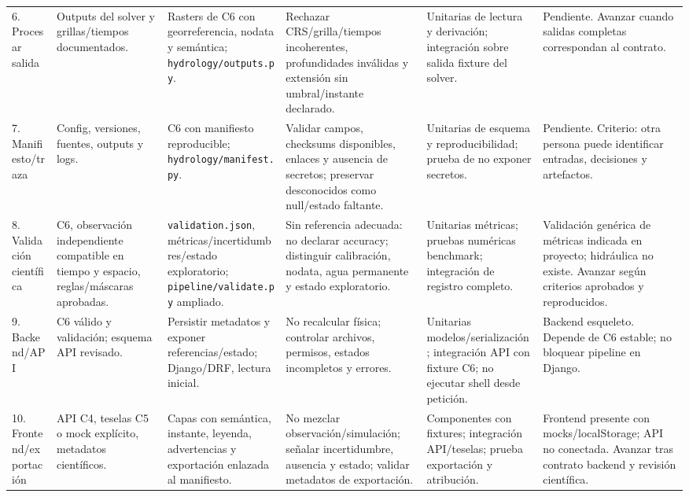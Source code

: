 \documentclass[11pt,a4paper]{article}
\begin{document}
\begin{landscape}
\begin{longtable}{p{.10\linewidth}p{.17\linewidth}p{.19\linewidth}p{.17\linewidth}p{.16\linewidth}p{.14\linewidth}}
6. Procesar salida & Outputs del solver y grillas/tiempos documentados. & Rasters de C6 con georreferencia, nodata y semántica; \texttt{hydrology/outputs.py}. & Rechazar CRS/grilla/tiempos incoherentes, profundidades inválidas y extensión sin umbral/instante declarado. & Unitarias de lectura y derivación; integración sobre salida fixture del solver. & Pendiente. Avanzar cuando salidas completas correspondan al contrato.\\
7. Manifiesto/traza & Config, versiones, fuentes, outputs y logs. & C6 con manifiesto reproducible; \texttt{hydrology/manifest.py}. & Validar campos, checksums disponibles, enlaces y ausencia de secretos; preservar desconocidos como null/estado faltante. & Unitarias de esquema y reproducibilidad; prueba de no exponer secretos. & Pendiente. Criterio: otra persona puede identificar entradas, decisiones y artefactos.\\
8. Validación científica & C6, observación independiente compatible en tiempo y espacio, reglas/máscaras aprobadas. & \texttt{validation.json}, métricas/incertidumbres/estado exploratorio; \texttt{pipeline/validate.py} ampliado. & Sin referencia adecuada: no declarar accuracy; distinguir calibración, nodata, agua permanente y estado exploratorio. & Unitarias métricas; pruebas numéricas benchmark; integración de registro completo. & Validación genérica de métricas indicada en proyecto; hidráulica no existe. Avanzar según criterios aprobados y reproducidos.\\
9. Backend/API & C6 válido y validación; esquema API revisado. & Persistir metadatos y exponer referencias/estado; Django/DRF, lectura inicial. & No recalcular física; controlar archivos, permisos, estados incompletos y errores. & Unitarias modelos/serialización; integración API con fixture C6; no ejecutar shell desde petición. & Backend esqueleto. Depende de C6 estable; no bloquear pipeline en Django.\\
10. Frontend/exportación & API C4, teselas C5 o mock explícito, metadatos científicos. & Capas con semántica, instante, leyenda, advertencias y exportación enlazada al manifiesto. & No mezclar observación/simulación; señalar incertidumbre, ausencia y estado; validar metadatos de exportación. & Componentes con fixtures; integración API/teselas; prueba exportación y atribución. & Frontend presente con mocks/localStorage; API no conectada. Avanzar tras contrato backend y revisión científica.\\
\bottomrule
\end{longtable}
\end{landscape}
\normalsize
\end{document}
